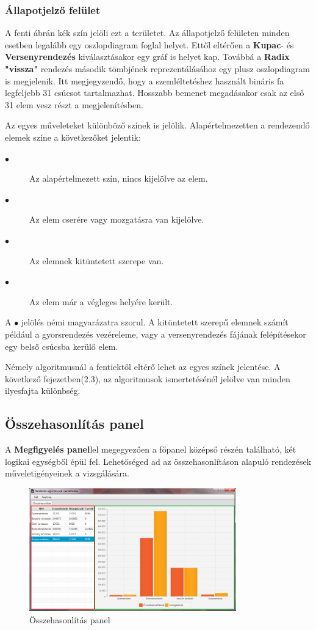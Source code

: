 \documentclass{elteikthesis}
\begin{document}
\subsubsection{Állapotjelző felület}
A fenti ábrán kék szín jelöli ezt a területet.
Az állapotjelző felületen minden esetben legalább egy oszlopdiagram foglal helyet. Ettől eltérően a \textbf{Kupac}- és \textbf{Versenyrendezés} kiválasztásakor egy gráf is helyet kap. Továbbá a \textbf{Radix "vissza"} rendezés második tömbjének reprezentálásához egy plusz oszlopdiagram is megjelenik. Itt megjegyzendő, hogy a szemléltetéshez használt bináris fa legfeljebb 31 csúcsot tartalmazhat. Hosszabb bemenet megadásakor csak az első 31 elem vesz részt a megjelenítésben.
\par Az egyes műveleteket különböző színek is jelölik. Alapértelmezetten a rendezendő elemek színe a következőket jelentik:\par
\begin{description}
	\item[\textcolor{default}{\Huge$\bullet$}] Az alapértelmezett szín, nincs kijelölve az elem.
	\item[\textcolor{swap}{\Huge$\bullet$}] Az elem cserére vagy mozgatásra van kijelölve.
	\item[\textcolor{select}{\Huge$\bullet$}] Az elemnek kitüntetett szerepe van.
	\item[\textcolor{done}{\Huge$\bullet$}] Az elem már a végleges helyére került.
\end{description}
A \textcolor{select}{\Huge$\bullet$} jelölés némi magyarázatra szorul. A kitüntetett szerepű elemnek számít például a gyorsrendezés vezéreleme, vagy a versenyrendezés fájának felépítésekor egy belső csúcsba kerülő elem.\par
Némely algoritmusnál a fentiektől eltérő lehet az egyes színek jelentése. A következő fejezetben(2.3), az algoritmusok ismertetésénél jelölve van minden ilyesfajta különbség.

\subsection{Összehasonlítás panel}
A \textbf{Megfigyelés panel}lel megegyezően a főpanel középső részén található, két logikai egységből épül fel. Lehetőséged ad az összehasonlításon alapuló rendezések műveletigényeinek a vizsgálására.
 \begin{figure}[H]
 	\centering
 	\includegraphics[width=0.8\textwidth]{pics/benchmarkpanel.png}
 	\caption{Összehasonlítás panel}
 \end{figure}
\end{document}
